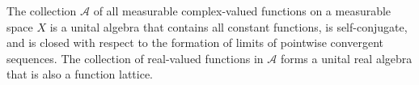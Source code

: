 The collection $\mathcal{A}$ of all measurable complex-valued functions on a measurable space $X$ is a unital algebra that contains all constant functions, is self-conjugate, and is closed with respect to the formation of limits of pointwise convergent sequences. The collection of real-valued functions in $\mathcal{A}$ forms a unital real algebra that is also a function lattice.

